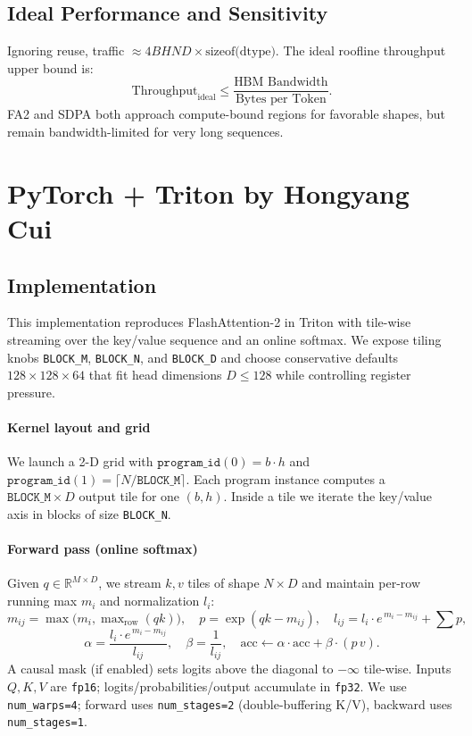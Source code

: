 \documentclass[11pt]{article}
\begin{document}
\subsection{Ideal Performance and Sensitivity}

Ignoring reuse, traffic $\approx 4BHND \times \text{sizeof(dtype)}$. The ideal roofline throughput upper bound is:
\[
\text{Throughput}_{\text{ideal}} \le \frac{\text{HBM Bandwidth}}{\text{Bytes per Token}}.
\]
FA2 and SDPA both approach compute-bound regions for favorable shapes, but remain bandwidth-limited for very long sequences.


\section{PyTorch + Triton by Hongyang Cui}
\subsection{Implementation}

This implementation reproduces FlashAttention-2 in Triton with tile-wise streaming over the key/value sequence and an online softmax. We expose tiling knobs \texttt{BLOCK\_M}, \texttt{BLOCK\_N}, and \texttt{BLOCK\_D} and choose conservative defaults $128\times128\times64$ that fit head dimensions $D\le 128$ while controlling register pressure.

\paragraph{Kernel layout and grid}
We launch a 2-D grid with $\texttt{program\_id}(0)=b\cdot h$ and $\texttt{program\_id}(1)=\lceil N/\texttt{BLOCK\_M}\rceil$. Each program instance computes a $\texttt{BLOCK\_M}\times D$ output tile for one $(b,h)$. Inside a tile we iterate the key/value axis in blocks of size \texttt{BLOCK\_N}.

\paragraph{Forward pass (online softmax)}
Given $q\in\mathbb{R}^{M\times D}$, we stream $k,v$ tiles of shape $N\times D$ and maintain per-row running max $m_i$ and normalization $l_i$:
\[
m_{ij}=\max\!\bigl(m_i, \max\nolimits_{\text{row}}(qk)\bigr),\quad
p=\exp(qk-m_{ij}),\quad
l_{ij}=l_i\cdot e^{\,m_i-m_{ij}}+\sum p,
\]
\[
\alpha=\frac{l_i\cdot e^{\,m_i-m_{ij}}}{l_{ij}},\quad
\beta=\frac{1}{l_{ij}},\quad
\mathrm{acc}\leftarrow \alpha\cdot \mathrm{acc}+\beta\cdot (p\,v).
\]
A causal mask (if enabled) sets logits above the diagonal to $-\infty$ tile-wise. Inputs $Q,K,V$ are \texttt{fp16}; logits/probabilities/output accumulate in \texttt{fp32}. We use \texttt{num\_warps=4}; forward uses \texttt{num\_stages=2} (double-buffering K/V), backward uses \texttt{num\_stages=1}.
\end{document}
